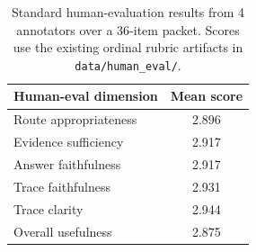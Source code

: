 \begin{table}[t]
\centering
\small
\begin{tabular}{lc}
\toprule
\textbf{Human-eval dimension} & \textbf{Mean score} \\
\midrule
Route appropriateness & 2.896 \\
Evidence sufficiency & 2.917 \\
Answer faithfulness & 2.917 \\
Trace faithfulness & 2.931 \\
Trace clarity & 2.944 \\
Overall usefulness & 2.875 \\
\bottomrule
\end{tabular}
\caption{Standard human-evaluation results from 4 annotators over a 36-item packet. Scores use the existing ordinal rubric artifacts in \texttt{data/human\_eval/}.}
\label{tab:human}
\end{table}
